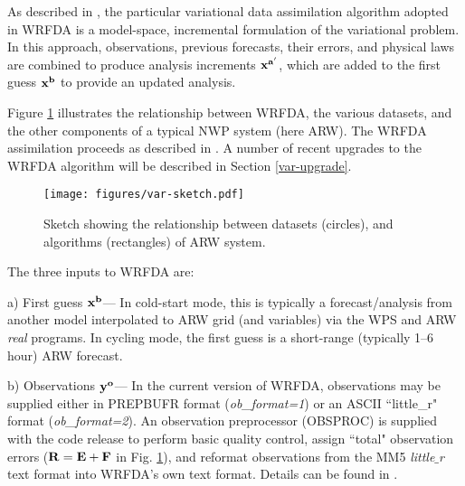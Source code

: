 As described in \citet{barker04}, the particular variational data
assimilation algorithm adopted in WRFDA is a model-space, incremental
formulation of the variational problem.  In this approach, observations,
previous forecasts, their errors, and physical laws are combined to
produce analysis increments ${\bf x^{a'}}$, which are added to the first
guess ${\bf x^{b}}$ to provide an updated analysis.

Figure \ref{var-sketch} illustrates the relationship between WRFDA,
the various datasets, and the other components of a typical NWP system
(here ARW). The WRFDA assimilation proceeds as described in
\citet{barker04}. A number of recent upgrades to the WRFDA algorithm
will be described in Section \ref{var-upgrade}.

%
%
\begin{figure}
  \centering
  \texttt{[image: figures/var-sketch.pdf]}
  \caption{\label{var-sketch}Sketch showing the relationship between datasets (circles), 
           and algorithms (rectangles) of ARW system.}
\end{figure}

The three inputs to WRFDA are: 

\vspace{0.5cm}

a) First guess ${\bf x^{b}}$--- In cold-start mode, this is typically a
forecast/analysis from another model interpolated to ARW grid (and variables) via the 
WPS and ARW {\it real} programs. In cycling mode, the first guess 
is a short-range (typically 1--6 hour) ARW forecast. 

\vspace{0.5cm}

b) Observations ${\bf y^{o}}$--- In the current version of WRFDA, observations may be 
supplied either in PREPBUFR format ({\it ob\_format=1}) or an ASCII ``little\_r" format
({\it ob\_format=2}). An observation preprocessor (OBSPROC) 
is supplied with the code release to perform basic quality control, assign ``total" 
observation errors (${\bf R = E+F}$ in Fig. \ref{var-sketch}), and reformat observations from the MM5 {\it little$\_$r} text 
format into WRFDA's own text format. Details can be found in \citet{barker03, barker04}.

\vspace{0.5cm}

